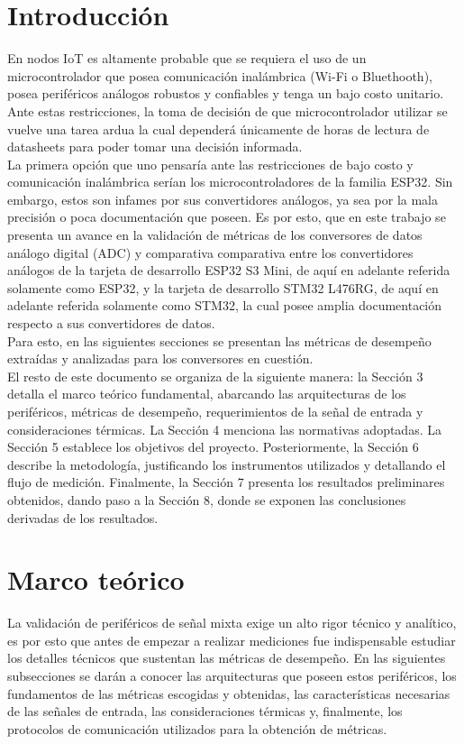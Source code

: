 \documentclass{article}
\begin{document}
\section{Introducción}
En nodos IoT es altamente probable que se requiera el uso de un microcontrolador que posea comunicación inalámbrica (Wi-Fi o Bluethooth), posea periféricos análogos robustos y confiables y tenga un bajo costo unitario. Ante estas restricciones, la toma de decisión de que microcontrolador utilizar se vuelve una tarea ardua la cual dependerá únicamente de horas de lectura de datasheets para poder tomar una decisión informada.\\
La primera opción que uno pensaría ante las restricciones de bajo costo y comunicación inalámbrica serían los microcontroladores de la familia ESP32. Sin embargo, estos son infames por sus convertidores análogos, ya sea por la mala precisión o poca documentación que poseen. Es por esto, que en este trabajo se presenta un avance en
la validación de métricas de los conversores de datos análogo digital (ADC) y comparativa
comparativa entre los convertidores análogos de la tarjeta de desarrollo ESP32 S3 Mini, de aquí en adelante referida solamente como ESP32, y la tarjeta de desarrollo STM32 L476RG, de aquí en adelante referida solamente como STM32, la cual  posee amplia documentación respecto a sus convertidores de datos.\\
Para esto, en las siguientes secciones se presentan las métricas de desempeño extraídas y analizadas para los conversores en cuestión.\\
El resto de este documento se organiza de la siguiente manera: la Sección 3 detalla el marco teórico fundamental, abarcando las arquitecturas de los periféricos, métricas de desempeño, requerimientos de la señal de entrada y consideraciones térmicas. La Sección 4 menciona las normativas adoptadas. La Sección 5 establece los objetivos del proyecto. Posteriormente, la Sección 6 describe la metodología, justificando los instrumentos utilizados y detallando el flujo de medición. Finalmente, la Sección 7 presenta los resultados preliminares obtenidos, dando paso a la Sección 8, donde se exponen las conclusiones derivadas de los resultados.
\section{Marco teórico}
La validación de periféricos de señal mixta exige un alto rigor técnico y analítico, es por esto que antes de empezar a realizar mediciones fue indispensable estudiar los detalles técnicos que sustentan las métricas de desempeño. En las siguientes subsecciones se darán a conocer las arquitecturas que poseen estos periféricos, los fundamentos de las métricas escogidas y obtenidas, las características necesarias de las señales de entrada, las consideraciones térmicas y, finalmente, los protocolos de comunicación utilizados para la obtención de métricas.   
\end{document}

